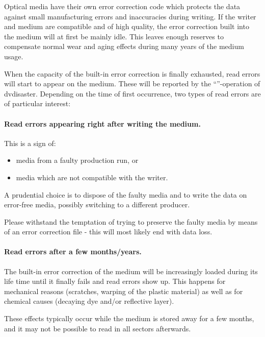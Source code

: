 Optical media have their own error correction code which protects the data against
small manufacturing errors and inaccuracies during writing. If the writer and medium
are compatible and of high quality, the error correction built into the medium will
at first be mainly idle. This leaves enough reserves to compensate normal wear and
aging effects during many years of the medium usage.

\smallskip

When the capacity of the built-in error correction is finally exhausted, read errors
will start to appear on the medium. These will be reported by
the ``''-operation
of dvdisaster. Depending on the time of first occurrence, two types of read errors
are of particular interest:

\paragraph{Read errors appearing right after writing the medium.} This is a sign of:

\begin{itemize}
\item media from a faulty production run, or
\item media which are not compatible with the writer.
\end{itemize}

A prudential choice is to dispose of the faulty media and to write the data
on error-free media, possibly switching to a different producer.

\smallskip

Please withstand the temptation of trying to preserve the faulty media
by means of an error correction file - this will most likely end with data loss.

\paragraph{Read errors after a few months/years.} The built-in error correction
of the medium will be increasingly loaded during its life time until it finally
fails and read errors show up. This happens for mechanical reasons (scratches,
warping of the plastic material) as well as for chemical causes (decaying dye
and/or reflective layer).

\smallskip

These effects typically occur while the medium is stored away for a few months,
and it may not be possible to read in all sectors afterwards.

